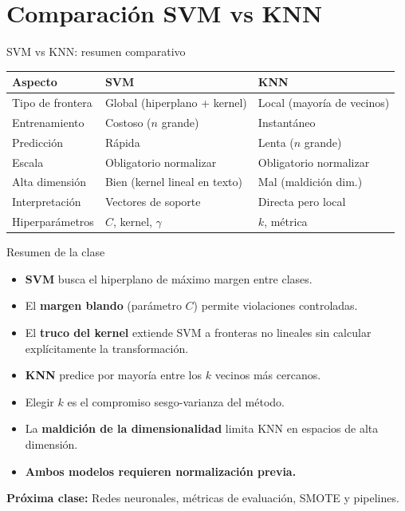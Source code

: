 \documentclass[aspectratio=169]{beamer}
\begin{document}
\section{Comparación SVM vs KNN}

\begin{frame}{SVM vs KNN: resumen comparativo}
  \begin{center}
  \begin{tabular}{lll}
    \toprule
    \textbf{Aspecto} & \textbf{SVM} & \textbf{KNN} \\
    \midrule
    Tipo de frontera & Global (hiperplano + kernel) & Local (mayoría de vecinos) \\
    Entrenamiento    & Costoso ($n$ grande)         & Instantáneo \\
    Predicción       & Rápida                        & Lenta ($n$ grande) \\
    Escala           & Obligatorio normalizar        & Obligatorio normalizar \\
    Alta dimensión   & Bien (kernel lineal en texto) & Mal (maldición dim.) \\
    Interpretación   & Vectores de soporte           & Directa pero local \\
    Hiperparámetros  & $C$, kernel, $\gamma$         & $k$, métrica \\
    \bottomrule
  \end{tabular}
  \end{center}
\end{frame}

\begin{frame}{Resumen de la clase}
  \begin{itemize}
    \item \textbf{SVM} busca el hiperplano de máximo margen entre clases.
    \item El \textbf{margen blando} (parámetro $C$) permite violaciones controladas.
    \item El \textbf{truco del kernel} extiende SVM a fronteras no lineales sin calcular explícitamente la transformación.
    \item \textbf{KNN} predice por mayoría entre los $k$ vecinos más cercanos.
    \item Elegir $k$ es el compromiso sesgo-varianza del método.
    \item La \textbf{maldición de la dimensionalidad} limita KNN en espacios de alta dimensión.
    \item \textbf{Ambos modelos requieren normalización previa.}
  \end{itemize}

  \bigskip
  \textbf{Próxima clase:} Redes neuronales, métricas de evaluación, SMOTE y pipelines.
\end{frame}
\end{document}
